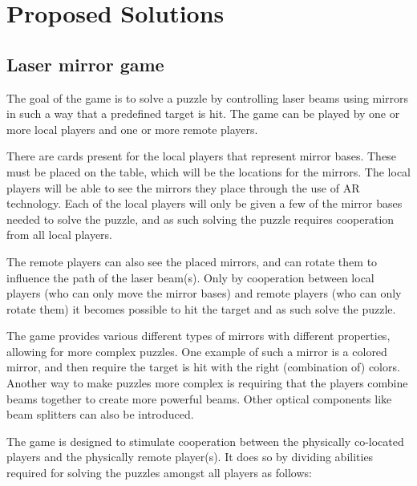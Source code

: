 \chapter{Proposed Solutions} \label{cha:solution}

\section{Laser mirror game} \label{sec:lasergame}
	The goal of the game is to solve a puzzle by controlling laser beams
	using mirrors in such a way that a predefined target is hit. The game
	can be played by one or more local players and one or more remote players.

	There are cards present for the local players that represent mirror
	bases. These must be placed on the table, which will be the locations
	for the mirrors. The local players will be able to see the mirrors they
	place through the use of AR technology. Each of the local players will
	only be given a few of the mirror bases needed to solve the puzzle, and
	as such solving the puzzle requires cooperation from all local players.

	The remote players can also see the placed mirrors, and can rotate them
	to influence the path of the laser beam(s). Only by cooperation between
	local players (who can only move the mirror bases) and remote players
	(who can only rotate them) it becomes possible to hit the target and as
	such solve the puzzle.

	The game provides various different types of mirrors with different
	properties, allowing for more complex puzzles. One example of such a
	mirror is a colored mirror, and then require the target is hit with the
	right (combination of) colors. Another way to make puzzles more complex
	is requiring that the players combine beams together to create more
	powerful beams. Other optical components like beam splitters can also be introduced.

	The game is designed to stimulate cooperation between the physically
	co-located players and the physically remote player(s). It does so by
	dividing abilities required for solving the puzzles amongst all players
	as follows:

